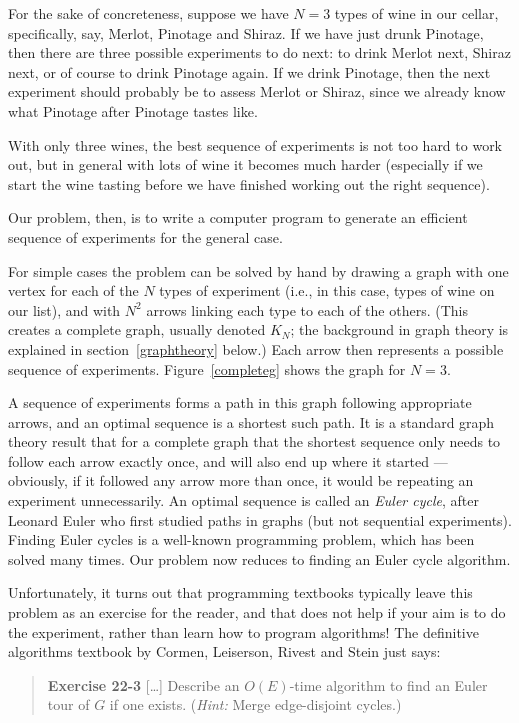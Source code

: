 \documentclass[12pt]{article}
\begin{document}
For the sake of concreteness, suppose we have $N=3$ types of wine in our cellar, specifically, say, Merlot, Pinotage and Shiraz. If we have just drunk Pinotage, then there are three possible experiments to do next: to drink Merlot next, Shiraz next, or of course to drink Pinotage again. If we drink Pinotage, then the next experiment should probably be to assess Merlot or Shiraz, since we already know what Pinotage after Pinotage tastes like. 

With only three wines, the best sequence of experiments is not too hard to work out, but in general with lots of wine it becomes much harder (especially if we start the wine tasting before we have finished working out the right sequence).

Our problem, then, is to write a computer program to generate an efficient sequence of experiments for the general case. 

For simple cases the problem can be solved by hand by drawing a graph with one vertex for each of the $N$ types of experiment (i.e., in this case, types of wine on our list), and with $N^2$ arrows linking each type to each of the others. (This creates a complete graph, usually denoted $K_N$; the background in graph theory is explained in section~\ref{graphtheory} below.) Each arrow then represents a possible sequence of experiments. Figure~\ref{completeg} shows the graph for $N=3$. 

A sequence of experiments forms a path in this graph following appropriate arrows, and an optimal sequence is a shortest such path. It is a standard graph theory result that for a complete graph that the shortest sequence only needs to follow each arrow exactly once, and will also end up where it started --- obviously, if it followed any arrow more than once, it would be repeating an experiment unnecessarily. An optimal sequence is called an \emph{Euler cycle}, after Leonard Euler who first studied paths in graphs (but not sequential experiments). Finding Euler cycles is a well-known programming problem, which has been solved many times. Our problem now reduces to finding an Euler cycle algorithm.

Unfortunately, it turns out that programming textbooks typically leave this problem as an exercise for the reader, and that does not help if your aim is to do the experiment, rather than learn how to program algorithms! The definitive algorithms textbook by Cormen, Leiserson, Rivest and Stein \cite[p623]{cormen} just says: 

\begin{quote}
\textbf{Exercise 22-3} [\ldots]
Describe an $O(E)$-time algorithm to find an Euler tour of $G$ if one exists. (\emph{Hint:\/} Merge edge-disjoint cycles.)
\end{quote}
\end{document}
